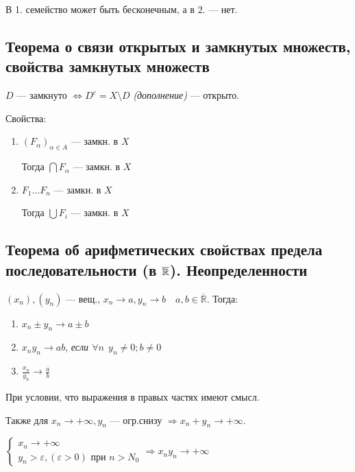 \begin{remark}
    В 1. семейство может быть бесконечным, а в 2. --- нет.
\end{remark}

\subsection{Теорема о связи открытых и замкнутых множеств, свойства замкнутых множеств}

$D$ --- замкнуто $\Leftrightarrow D^c=X\setminus D$ \textit{(дополнение)} --- открыто.

Свойства:

\begin{enumerate}
    \item $(F_\alpha)_{\alpha\in A}$ --- замкн. в $X$
    
    Тогда $\bigcap F_\alpha$ --- замкн. в $X$

    \item $F_1\ldots F_n$ --- замкн. в $X$
    
    Тогда $\bigcup F_i$ --- замкн. в $X$
\end{enumerate}

\subsection{Теорема об арифметических свойствах предела последовательности  (в $\overline{\operatorname*{\mathbb{R}}}$). Неопределенности}

$(x_n),(y_n)$ --- вещ., $x_n\to a, y_n\to b \quad a,b\in\mathbb{\overline R}$.
Тогда:
\begin{enumerate}
    \item $x_n\pm y_n\to a\pm b$
    \item $x_n y_n\to a b$,
    \textit{если $\forall n \ \ y_n\not=0; b\not=0$}
    \item $\frac{x_n}{y_n}\to\frac{a}{b}$
\end{enumerate}
При условии, что выражения в правых частях имеют смысл.

Также для $x_n\to+\infty, y_n$ --- огр.снизу $\Rightarrow x_n+y_n\to+\infty$.

$\begin{cases}
    x_n\to+\infty \\
    y_n>\varepsilon, (\varepsilon>0) \text{ при } n>N_0
\end{cases} \Rightarrow x_ny_n\to +\infty$


